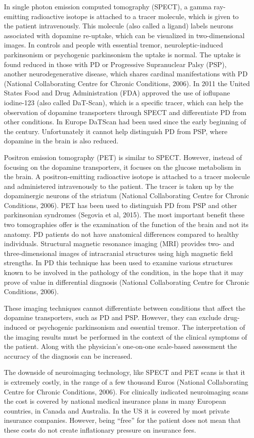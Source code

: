 In single photon emission computed tomography (SPECT), a gamma ray-emitting radioactive isotope is attached to a tracer molecule, which is given to the patient intravenously. This molecule (also called a ligand) labels neurons associated with dopamine re-uptake, which can be visualized in two-dimensional images. In controls and people with essential tremor, neuroleptic-induced parkinsonism or psychogenic parkinsonism the uptake is normal. The uptake is found reduced in those with \gls{PD} or Progressive Supranuclear Palsy (PSP), another neurodegenerative disease, which shares cardinal manifestations with \gls{PD} (National Collaborating Centre for Chronic Conditions, 2006). In 2011 the United States Food and Drug Administration (FDA) approved the use of ioflupane iodine-123 (also called DaT-Scan), which is a specific tracer, which can help the observation of dopamine transporters through SPECT and differentiate \gls{PD} from other conditions. In Europe DaTScan had been used since the early beginning of the century. Unfortunately it cannot help distinguish \gls{PD} from PSP, where dopamine in the brain is also reduced.

Positron emission tomography (PET) is similar to SPECT. However, instead of focusing on the dopamine transporters, it focuses on the glucose metabolism in the brain. A positron-emitting radioactive isotope is attached to a tracer molecule and administered intravenously to the patient. The tracer is taken up by the dopaminergic neurons of the striatum (National Collaborating Centre for Chronic Conditions, 2006). PET has been used to distinguish \gls{PD} from PSP and other parkinsonian syndromes (Segovia et al, 2015). The most important benefit these two tomographies offer is the examination of the function of the brain and not its anatomy. \gls{PD} patients do not have anatomical differences compared to healthy individuals. Structural magnetic resonance imaging (MRI) provides two- and three-dimensional images of intracranial structures using high magnetic field strengths. In \gls{PD} this technique has been used to examine various structures known to be involved in the pathology of the condition, in the hope that it may prove of value in differential diagnosis (National Collaborating Centre for Chronic Conditions, 2006).

These imaging techniques cannot differentiate between conditions that affect the dopamine transporters, such as \gls{PD} and PSP. However, they can exclude drug-induced or psychogenic parkinsonism and essential tremor. The interpretation of the imaging results must be performed in the context of the clinical symptoms of the patient. Along with the physician's one-on-one scale-based assessment the accuracy of the diagnosis can be increased. 

The downside of neuroimaging technology, like SPECT and PET scans is that it is extremely costly, in the range of a few thousand Euros (National Collaborating Centre for Chronic Conditions, 2006). For clinically indicated neuroimaging scans the cost is covered by national medical insurance plans in many European countries, in Canada and Australia. In the US it is covered by most private insurance companies. However, being ``free'' for the patient does not mean that these costs do not create inflationary pressure on insurance fees. 
